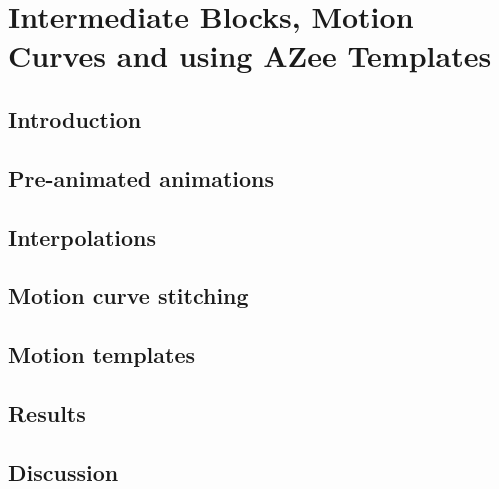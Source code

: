 \chapter{Intermediate Blocks, Motion Curves and using AZee Templates}

\section{Introduction}

\section{Pre-animated animations}

\section{Interpolations}

\section{Motion curve stitching}

\section{Motion templates}

\section{Results}

\section{Discussion}